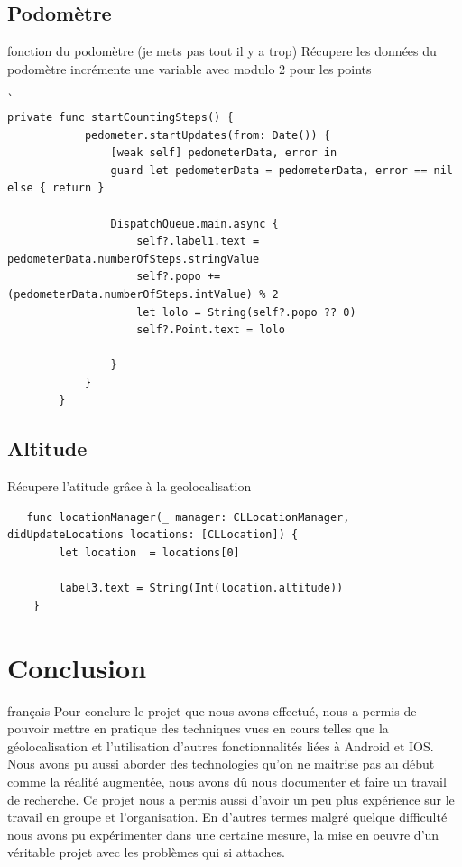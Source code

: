 \documentclass{article}
\begin{document}
\subsection{Podomètre }
fonction du podomètre (je mets pas tout il y a trop)
Récupere les données du podomètre incrémente une variable avec modulo 2 pour les points 
\begin{verbatim}`
private func startCountingSteps() {
            pedometer.startUpdates(from: Date()) {
                [weak self] pedometerData, error in
                guard let pedometerData = pedometerData, error == nil else { return }

                DispatchQueue.main.async {
                    self?.label1.text = pedometerData.numberOfSteps.stringValue
                    self?.popo += (pedometerData.numberOfSteps.intValue) % 2
                    let lolo = String(self?.popo ?? 0)
                    self?.Point.text = lolo
                    
                }
            }
        }

\end{verbatim}
\subsection{Altitude }
Récupere l'atitude grâce à la geolocalisation 
\begin{verbatim}
   func locationManager(_ manager: CLLocationManager, didUpdateLocations locations: [CLLocation]) {
        let location  = locations[0]

        label3.text = String(Int(location.altitude))
    }
\end{verbatim}
\section{Conclusion}
 français
Pour conclure le projet que nous avons effectué, nous a permis de pouvoir mettre en pratique des techniques vues en cours telles que la géolocalisation et l’utilisation d'autres fonctionnalités liées à Android et IOS. Nous avons pu aussi aborder des technologies qu’on ne maitrise pas au début comme la réalité augmentée, nous avons dû nous documenter et faire un travail de recherche. Ce projet nous a permis aussi d’avoir un peu plus expérience sur le travail en groupe et l’organisation. En d'autres termes malgré quelque difficulté nous avons pu expérimenter dans une certaine mesure, la mise en oeuvre d’un véritable projet avec les problèmes qui si attaches.



\end{document}
